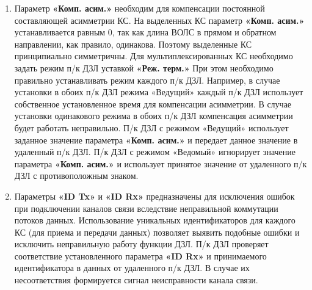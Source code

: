 \begin{enumerate}
\begin{enumerate}
\item Параметр \textbf{«Комп. асим.»} необходим для компенсации постоянной составляющей асимметрии КС. На выделенных КС параметр \textbf{«Комп. асим.»} устанавливается равным 0, так как длина ВОЛС в прямом и обратном направлении, как правило, одинакова. Поэтому выделенные КС принципиально симметричны. Для мультиплексированных КС необходимо задать режим п/к ДЗЛ уставкой \textbf{«Реж. терм.»} При этом необходимо правильно устанавливать режим каждого п/к ДЗЛ. Например, в случае установки в обоих п/к ДЗЛ режима «Ведущий» каждый п/к ДЗЛ использует собственное установленное время для компенсации асимметрии. В случае установки одинакового режима в обоих п/к ДЗЛ компенсация асимметрии будет работать неправильно. П/к ДЗЛ с режимом «Ведущий» использует заданное значение параметра \textbf{«Комп. асим.»} и передает данное значение в удаленный п/к ДЗЛ. П/к ДЗЛ с режимом «Ведомый» игнорирует значение параметра \textbf{«Комп. асим.»} и использует принятое значение от удаленного п/к ДЗЛ с противоположным знаком.
\item Параметры \textbf{«ID Tx»} и \textbf{«ID Rx»} предназначены для исключения ошибок при подключении каналов связи вследствие неправильной коммутации потоков данных. Использование уникальных идентификаторов для каждого КС (для приема и передачи данных) позволяет выявить подобные ошибки и исключить неправильную работу функции ДЗЛ. П/к ДЗЛ проверяет соответствие установленного параметра \textbf{«ID Rx»} и принимаемого идентификатора в данных от удаленного п/к ДЗЛ. В случае их несоответствия формируется сигнал неисправности канала связи.
\end{enumerate}


\end{enumerate}
